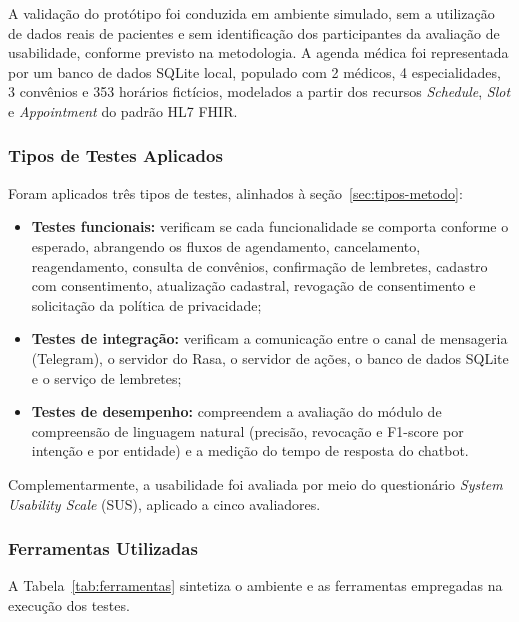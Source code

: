 \documentclass[12pt,a4paper]{extarticle}
\begin{document}
A validação do protótipo foi conduzida em ambiente simulado, sem a utilização de dados reais de pacientes e sem identificação dos participantes da avaliação de usabilidade, conforme previsto na metodologia. A agenda médica foi representada por um banco de dados SQLite local, populado com 2 médicos, 4 especialidades, 3 convênios e 353 horários fictícios, modelados a partir dos recursos \textit{Schedule}, \textit{Slot} e \textit{Appointment} do padrão HL7 FHIR.

\subsubsection{Tipos de Testes Aplicados}
\label{sec:tipos_testes}

Foram aplicados três tipos de testes, alinhados à seção~\ref{sec:tipos-metodo}:

\begin{itemize}
    \item \textbf{Testes funcionais:} verificam se cada funcionalidade se comporta conforme o esperado, abrangendo os fluxos de agendamento, cancelamento, reagendamento, consulta de convênios, confirmação de lembretes, cadastro com consentimento, atualização cadastral, revogação de consentimento e solicitação da política de privacidade;
    \item \textbf{Testes de integração:} verificam a comunicação entre o canal de mensageria (Telegram), o servidor do Rasa, o servidor de ações, o banco de dados SQLite e o serviço de lembretes;
    \item \textbf{Testes de desempenho:} compreendem a avaliação do módulo de compreensão de linguagem natural (precisão, revocação e F1-score por intenção e por entidade) e a medição do tempo de resposta do chatbot.
\end{itemize}

Complementarmente, a usabilidade foi avaliada por meio do questionário \textit{System Usability Scale} (SUS), aplicado a cinco avaliadores.

\subsubsection{Ferramentas Utilizadas}
\label{sec:ferramentas}

A Tabela~\ref{tab:ferramentas} sintetiza o ambiente e as ferramentas empregadas na execução dos testes.
\end{document}
